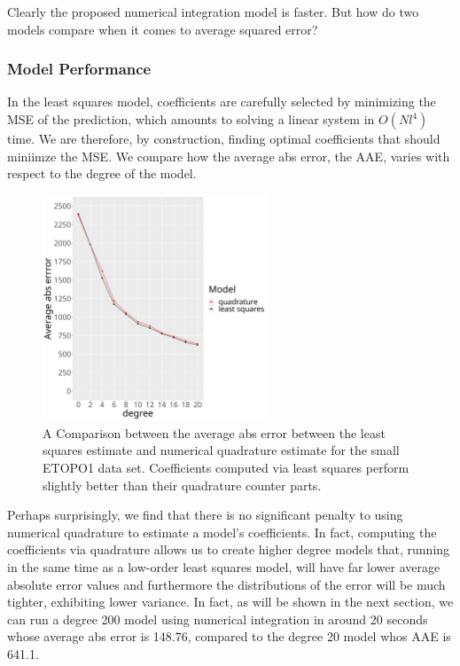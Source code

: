 \documentclass[a4paper]{article}
\theoremstyle{definition}
\begin{document}
Clearly the proposed numerical integration model is faster. But how do two models compare when it comes to average squared error? 


\newpage
\subsubsection{Model Performance}

In the least squares model, coefficients are carefully selected by minimizing the MSE of the prediction, which amounts to solving a linear system in $O(Nl^4)$ time. We are therefore,
by construction, finding optimal coefficients that should miniimze the MSE. We compare how the average abs error, the AAE, varies with
respect to the degree of the model.


\begin{figure}[h!]
    \centering
    \includegraphics[width=0.6\textwidth]{media/diff_error.png}
    \caption{A Comparison between the average abs error between the least squares estimate and numerical quadrature estimate for the small ETOPO1 data set. Coefficients computed via least squares
    perform slightly better than their quadrature counter parts.}
    \label{fig:erorr}
\end{figure}

Perhaps surprisingly, we find that there is no significant penalty to using numerical quadrature to estimate a model's coefficients. In fact, computing the coefficients via quadrature allows us to 
create higher degree models that, running in the same time as a low-order least squares model, will have far lower average absolute error values and furthermore the distributions of the error will be
much tighter, exhibiting lower variance. In fact, as will be shown in the next section, we can run a degree 200 model using numerical integration in around 20 seconds whose average abs error
is 148.76, compared to the degree 20 model whos AAE is 641.1.
\end{document}
